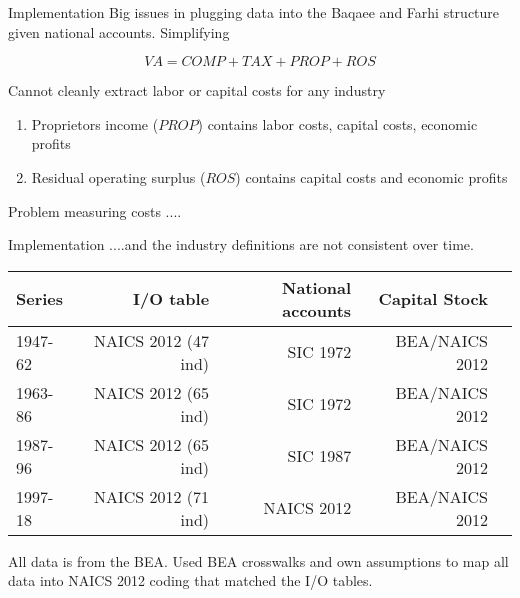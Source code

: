\documentclass[10pt,xcolor=dvipsnames]{beamer}
\begin{document}
\begin{frame}{Implementation}
Big issues in plugging data into the Baqaee and Farhi structure given national accounts. Simplifying

\begin{equation}
  VA = COMP + TAX + PROP + ROS
\end{equation}

Cannot cleanly extract labor or capital costs for any industry
\begin{enumerate}
  \item Proprietors income ($PROP$) contains labor costs, capital costs, economic profits
  \item Residual operating surplus ($ROS$) contains capital costs and economic profits
\end{enumerate}

Problem measuring costs ....

\end{frame}

\begin{frame}{Implementation}\label{Smatch}
....and the industry definitions are not consistent over time.

\vspace{.25in}

\begin{tabular}{lrrrr}
Series  & I/O table  & National accounts & Capital Stock \\ \hline
1947-62 & NAICS 2012 (47 ind) & SIC 1972 & BEA/NAICS 2012 \\
1963-86 & NAICS 2012 (65 ind) & SIC 1972 & BEA/NAICS 2012 \\
1987-96 & NAICS 2012 (65 ind) & SIC 1987 & BEA/NAICS 2012 \\
1997-18 & NAICS 2012 (71 ind) & NAICS 2012 & BEA/NAICS 2012 \\ \hline
\end{tabular}

\vspace{.25in} All data is from the BEA. Used BEA crosswalks and own assumptions to map all data into NAICS 2012 coding that matched the I/O tables.

\vspace{.25in} \hfill \hyperlink{Amatch}{}
\end{frame}
\end{document}
